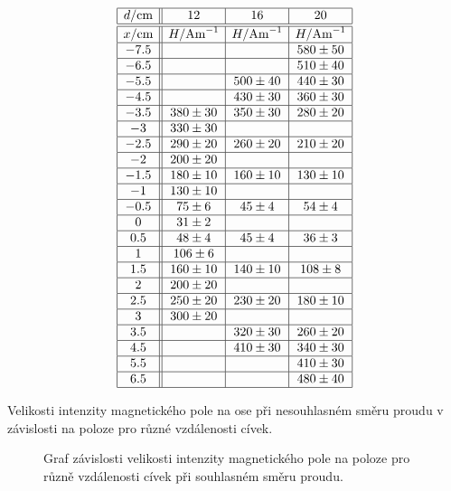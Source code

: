 \documentclass[a4paper,12pt]{article}
\begin{document}
\begin{table}
$$
\begin{array}{|c||c|c|c|}
\hline
d/\mbox{cm}&    12& 16& 20  \\ \hline \hline
x/\mbox{cm}&    H/\mbox{Am}^{-1}&   H/\mbox{Am}^{-1}&   H/\mbox{Am}^{-1} \\ \hline
-7.5&   &   &   580\pm50    \\ \hline
-6.5&   &   &   510\pm40    \\ \hline
-5.5&   &   500\pm40&   440\pm30    \\ \hline
-4.5&   &   430\pm30&   360\pm30    \\ \hline
-3.5&   380\pm30&   350\pm30&   280\pm20 \\ \hline
-3& 330\pm30&   &      \\ \hline
-2.5&   290\pm20&   260\pm20&   210\pm20 \\ \hline
-2& 200\pm20&   &      \\ \hline
-1.5&   180\pm10&   160\pm10&   130\pm10 \\ \hline
-1& 130\pm10&    &    \\ \hline
-0.5&   75\pm6&   45\pm4&   54\pm4 \\ \hline
0&  31\pm2&   &    \\ \hline
0.5&    48\pm4&   45\pm4&   36\pm3 \\ \hline
1&  106\pm6&   &    \\ \hline
1.5&    160\pm10&   140\pm10&   108\pm8 \\ \hline
2&  200\pm20&   &    \\ \hline
2.5&    250\pm20&   230\pm20&   180\pm10 \\ \hline
3&  300\pm20& &  \\ \hline
3.5&    &   320\pm30&   260\pm20 \\ \hline
4.5&    &   410\pm30&   340\pm30 \\ \hline
5.5&    &   &   410\pm30 \\ \hline
6.5&    &   &   480\pm 40 \\ \hline
\end{array}
$$
\caption{Velikosti intenzity magnetického pole na ose při nesouhlasném směru proudu v závislosti na poloze pro různé vzdálenosti cívek.}
\label{nesouhlas}
\end{table}

\begin{figure}

\caption{Graf závislosti velikosti intenzity magnetického pole na poloze pro různě vzdálenosti cívek při souhlasném směru proudu.}
\label{g1}
\end{figure}
\end{document}
